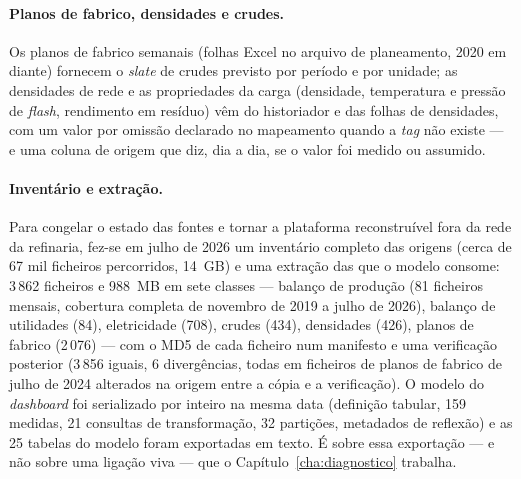 \paragraph{Planos de fabrico, densidades e crudes.} Os planos de fabrico
semanais (folhas Excel no arquivo de planeamento, 2020 em diante)
fornecem o \emph{slate} de crudes previsto por período e por unidade; as
densidades de rede e as propriedades da carga (densidade, temperatura e
pressão de \emph{flash}, rendimento em resíduo) vêm do historiador e das
folhas de densidades, com um valor por omissão declarado no mapeamento
quando a \emph{tag} não existe --- e uma coluna de origem que diz, dia a
dia, se o valor foi medido ou assumido.

\paragraph{Inventário e extração.} Para congelar o estado das fontes e
tornar a plataforma reconstruível fora da rede da refinaria, fez-se em
julho de 2026 um inventário completo das origens (cerca de 67 mil ficheiros
percorridos, 14~GB) e uma extração das que o modelo consome: 3\,862
ficheiros e 988~MB em sete classes --- balanço de produção (81 ficheiros
mensais, cobertura completa de novembro de 2019 a julho de 2026), balanço
de utilidades (84), eletricidade (708), crudes (434), densidades (426),
planos de fabrico (2\,076) --- com o MD5 de cada ficheiro num manifesto e
uma verificação posterior (3\,856 iguais, 6 divergências, todas em
ficheiros de planos de fabrico de julho de 2024 alterados na origem entre a
cópia e a verificação).
O modelo do \emph{dashboard} foi serializado por inteiro na mesma data
(definição tabular, 159 medidas, 21 consultas de transformação, 32
partições, metadados de reflexão) e as 25 tabelas do modelo foram
exportadas em texto. É sobre essa exportação --- e não sobre uma ligação
viva --- que o Capítulo~\ref{cha:diagnostico} trabalha.

